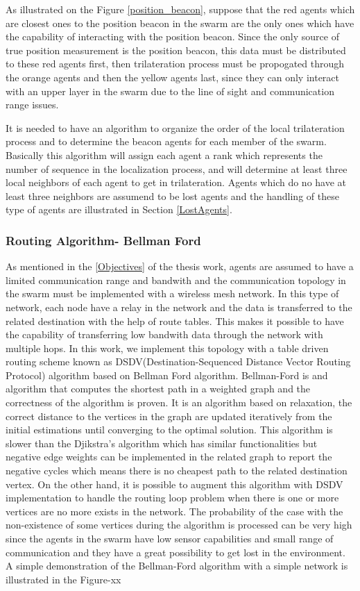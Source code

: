 As illustrated on the Figure \ref{position_beacon}, suppose that the red agents which are closest ones to the position beacon in the swarm are the only ones which have the capability of interacting with the position beacon. Since the only source of true position measurement is the position beacon, this data must be distributed to these red agents first, then trilateration process must be propogated through the orange agents and then the yellow agents last, since they can only interact with an upper layer in the swarm due to the line of sight and communication range issues.

It is needed to have an algorithm to organize the order of the local trilateration process and to determine the beacon agents for each member of the swarm. Basically this algorithm will assign each agent a rank which represents the number of sequence in the localization process, and will determine at least three local neighbors of each agent to get in trilateration. Agents which do no have at least three neighbors are assumend to be lost agents and the handling of these type of agents are illustrated in Section \ref{LostAgents}.
	
\subsubsection{Routing Algorithm- Bellman Ford}
As mentioned in the \ref{Objectives} of the thesis work, agents are assumed to have a limited communication range and bandwith and the communication topology in the swarm must be implemented with a wireless mesh network. In this type of network, each node have a relay in the network and the data is transferred to the related destination with the help of route tables. This makes it possible to have the capability of transferring low bandwith data through the network with multiple hops.  In this work, we implement this topology with a table driven routing scheme known as DSDV(Destination-Sequenced Distance Vector Routing Protocol) algorithm based on Bellman Ford algorithm. Bellman-Ford is and algorithm that computes the shortest path in a weighted graph and the correctness of the algorithm is proven. It is an algorithm based on relaxation, the correct distance to the vertices in the graph are updated iteratively from the initial estimations until converging to the optimal solution. This algorithm is slower than the Djikstra's algorithm which has similar functionalities but negative edge weights can be implemented in the related graph to report the negative cycles which means there is no cheapest path to the related destination vertex. On the other hand, it is possible to augment this algorithm with DSDV implementation to handle the routing loop problem when there is one or more vertices are no more exists in the network. The probability of the case with the non-existence of some vertices during the algorithm is processed can be very high since the agents in the swarm have low sensor capabilities and small range of communication and they have a great possibility to get lost in the environment. A simple demonstration of the Bellman-Ford algorithm with a simple network is illustrated in the Figure-xx
	
